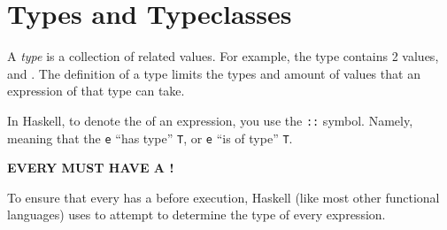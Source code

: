 \section{Types and Typeclasses}\label{sec:Types_Typeclasses}
\begin{definition}[Type]\label{def:Type}
  A \emph{type} is a collection of related values.
  For example, the  type contains 2 values,  and .
  The definition of a type limits the types and amount of values that an expression of that type can take.
\end{definition}

In Haskell, to denote the  of an expression, you use the \texttt{::} symbol.
Namely,  meaning that the  \texttt{e} ``has type'' \texttt{T}, or \texttt{e} ``is of type'' \texttt{T}.

\begin{blackbox}
  {\large{\textbf{EVERY  MUST HAVE A !}}}
\end{blackbox}

To ensure that every  has a  before execution, Haskell (like most other functional languages) uses  to attempt to determine the type of every expression.


